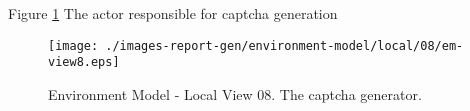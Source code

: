 
Figure \ref{fig:lu.uni.lassy.excalibur.examples.icrash-EM-view-local-08} The actor responsible for captcha generation


\begin{figure}[htbp] 
\label{fig:lu.uni.lassy.excalibur.examples.icrash-EM}
\begin{center}
\texttt{[image: ./images-report-gen/environment-model/local/08/em-view8.eps]}
\end{center}
\caption[Environment Model - Local View 08 - The captcha generator]{Environment Model - Local View 08. The captcha generator.}
\label{fig:lu.uni.lassy.excalibur.examples.icrash-EM-view-local-08}
\end{figure}
\vspace{0.5cm} 
